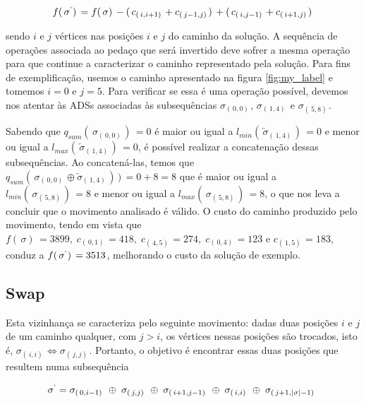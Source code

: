     \begin{gather}
        f(\,\sigma^\lq)\, = f(\,\sigma)\, - (\,c_{(\,i, i+1)\,} + c_{(\,j-1, j)\,})\, + (\,c_{(\,i, j-1)\,} + c_{(\,i+1, j)\,})\,
    \end{gather}
    
sendo $i$ e $j$ vértices nas posições $i$ e $j$ do caminho da solução. A sequência de operações associada ao pedaço que será invertido deve sofrer a mesma operação para que continue a caracterizar o caminho representado pela solução. Para fins de exemplificação, usemos o caminho apresentado na figura \ref{fig:my_label} e tomemos $i = 0$ e $j = 5$. Para verificar se essa é uma operação possível, devemos nos atentar às ADSs associadas às subsequências $\sigma_{(\,0, 0)\,}$, $\sigma_{(\,1, 4)\,}$ e $\sigma_{(\,5, 8)\,}$.

\par Sabendo que $q_{sum}(\,\sigma_{(\,0, 0)\,})\, = 0$ é maior ou igual a $l_{min}(\,\overleftarrow{\sigma}_{(\,1, 4)\,})\, = 0$ e menor ou igual a $l_{max}(\,\overleftarrow{\sigma}_{(\,1, 4)\,})\, = 0$, é possível realizar a concatenação dessas subsequências. Ao concatená-las, temos que $q_{sum}(\,\sigma_{(\,0, 0)\,} \oplus \overleftarrow{\sigma}_{(\,1, 4)\,})\,)\, = 0 + 8 = 8$ que é maior ou igual a $l_{min}(\,\sigma_{(\,5, 8)\,})\, = 8$ e menor ou igual a $l_{max}(\,\sigma_{(\,5, 8)\,})\, = 8$, o que nos leva a concluir que o movimento analisado é válido. O custo do caminho produzido pelo movimento, tendo em vista que $f(\,\sigma)\, = 3899,\; c_{(\,0, 1)\,} = 418,\; c_{(\,4, 5)\,} = 274,\; c_{(\,0, 4)\,} = 123$ e $c_{(\,1, 5)\,} = 183$, conduz a $f(\,\sigma^\lq)\, = 3513$, melhorando o custo da solução de exemplo.

\subsection{Swap}\label{sec:LABEL_CHP_5_SUBSEC_B}

\par Esta vizinhança se caracteriza pelo seguinte movimento: dadas duas posições $i$ e $j$ de um caminho qualquer, com $j > i$, os vértices nessas posições são trocados, isto é, $\sigma_{(\,i, i)\,} \Longleftrightarrow \sigma_{(\,j, j)\,}$. Portanto, o objetivo é encontrar essas duas posições que resultem numa subsequência

    \begin{gather} \label{swapeq:1}
        \sigma^\lq = \sigma_{(\,0, i - 1)\,}\; \oplus\; \sigma_{(\,j, j)\,}\; \oplus\; \sigma_{(\,i+1, j-1)\,}\; \oplus\; \sigma_{(\,i, i)\,}\;
        \oplus\; \sigma_{(\,j+1, |\sigma| - 1)\,}\;
    \end{gather}
    
